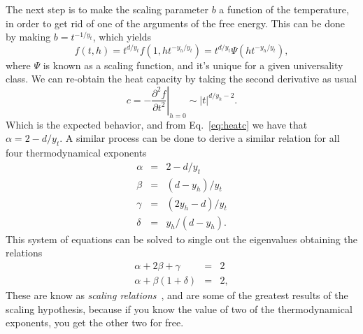 The next step is to make the scaling parameter $b$ a function of the
temperature, in order to get rid of one of the arguments of the free energy.
This can be done by making $b=t^{-1/y_t}$, which yields
\begin{equation}
    f\left(t,h\right)=
    t^{d/y_{t}}f\left(1,ht^{-y_{h}/y_{t}}\right)=
    t^{d/y_{t}}\Psi\left(ht^{-y_{h}/y_{t}}\right),
\end{equation}
where $\Psi$ is known as a scaling function, and it's unique for a given
universality class. We can re-obtain the heat capacity by taking
the second derivative as usual
\begin{equation}
    c=-\left.\frac{\partial^2 f}{\partial t^2}\right|_{h=0}
    \sim \left|t\right|^{d/y_h-2}.
\end{equation}
Which is the expected behavior, and from Eq.~\ref{eq:heatc} we have that
$\alpha=2-d/y_t$. A similar process can be done to derive a similar relation
for all four thermodynamical exponents
\begin{eqnarray}
    \label{eq:scal1}
    \alpha & = & 2-d/y_{t}\\
    \beta  & = & \left(d-y_{h}\right)/y_{t}\\
    \gamma & = & \left(2y_{h}-d\right)/y_{t}\\
    \label{eq:scal2}
    \delta & = & y_{h}/\left(d-y_{h}\right).
\end{eqnarray}
This system of equations can be solved to single out the eigenvalues obtaining
the relations
\begin{eqnarray}
    \alpha+2\beta+\gamma              & = & 2\\
    \alpha+\beta\left(1+\delta\right) & = & 2,
\end{eqnarray}
These are know as \textit{scaling relations}~\cite{Rushbrooke1963,
Griffiths1967}, and are some of the greatest results of the scaling
hypothesis, because if you know the value of two of the thermodynamical
exponents, you get the other two for free.

